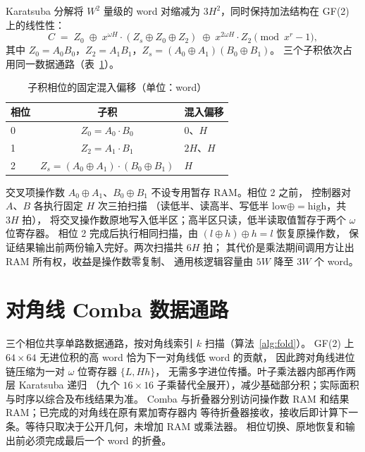 \documentclass{article}
\newcommand{\wop}{\omega}
\begin{document}
Karatsuba 分解将 $W^2$ 量级的 word 对缩减为 $3H^2$，同时保持加法结构在 GF(2) 上的线性性：
\begin{equation}
C \;=\; Z_0 \;\oplus\; x^{\wop H}\!\cdot\!(Z_s\oplus Z_0\oplus Z_2) \;\oplus\; x^{2\wop H}\!\cdot\! Z_2
\pmod{x^r-1},
\label{eq:recomb}
\end{equation}
其中 $Z_0=A_0B_0$，$Z_2=A_1B_1$，$Z_s=(A_0{\oplus}A_1)(B_0{\oplus}B_1)$。
三个子积依次占用同一数据通路（表~\ref{tab:offset}）。

\begin{table}[htbp]
\centering
\caption{子积相位的固定混入偏移（单位：word）}
\label{tab:offset}
\begin{tabular}{lcl}
\toprule
相位 & 子积 & 混入偏移 \\
\midrule
0 & $Z_0=A_0\cdot B_0$ & $0$、$H$ \\
1 & $Z_2=A_1\cdot B_1$ & $2H$、$H$ \\
2 & $Z_s=(A_0{\oplus}A_1)\cdot(B_0{\oplus}B_1)$ & $H$ \\
\bottomrule
\end{tabular}
\end{table}

交叉项操作数 $A_0{\oplus}A_1$、$B_0{\oplus}B_1$ 不设专用暂存 RAM。相位 2 之前，
控制器对 $A$、$B$ 各执行固定 $H$ 次三拍扫描
（读低半、读高半、写低半 $\mathrm{low}\oplus{=}\mathrm{high}$，共 $3H$ 拍），
将交叉操作数原地写入低半区；高半区只读，低半读取值暂存于两个 $\wop$ 位寄存器。
相位 2 完成后执行相同扫描，由 $(l\oplus h)\oplus h=l$ 恢复原操作数，
保证结果输出前两份输入完好。两次扫描共 $6H$ 拍；
其代价是乘法期间调用方让出 RAM 所有权，收益是操作数零复制、
通用核逻辑容量由 $5W$ 降至 $3W$ 个 word。

\section{对角线 Comba 数据通路}

三个相位共享单路数据通路，按对角线索引 $k$ 扫描（算法~\ref{alg:fold}）。
GF(2) 上 $64{\times}64$ 无进位积的高 word 恰为下一对角线低 word 的贡献，
因此跨对角线进位链压缩为一对 $\wop$ 位寄存器 $\{L,Hh\}$，
无需多字进位传播。叶子乘法器内部再作两层 Karatsuba 递归
（九个 $16{\times}16$ 子乘替代全展开），减少基础部分积；实际面积与时序以综合及布线结果为准。
Comba 与折叠器分别访问操作数 RAM 和结果 RAM；已完成的对角线在原有累加寄存器内
等待折叠器接收，接收后即计算下一条。等待只取决于公开几何，未增加 RAM 或乘法器。
相位切换、原地恢复和输出前必须完成最后一个 word 的折叠。
\end{document}
